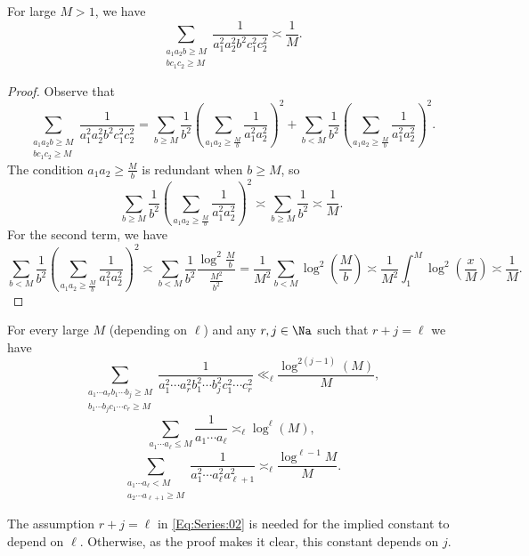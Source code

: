 \documentclass[12pt,a4paper]{amsart}
\begin{document}
\begin{lem01}
For large $M>1$, we have
\begin{equation}\label{Eq:01:02}
\sum_{\substack{a_1a_2 b\geq M \\ b c_1c_2\geq M}} \frac{1}{a_1^2a_2^2b^2c_1^2c_2^2}
\asymp
\frac{1}{M}. 
\end{equation}
\end{lem01}
\begin{proof}
Observe that
\[
\sum_{\substack{a_1a_2 b\geq M \\ b c_1c_2\geq M}} \frac{1}{a_1^2a_2^2b^2c_1^2c_2^2}
=
\sum_{b\geq M} 
\frac{1}{b^2}
\left( \sum_{a_1 a_2 \geq \frac{M}{b}} \frac{1}{a_1^2a_2^2}\right)^2
+
\sum_{b<M} 
\frac{1}{b^2}
\left( \sum_{a_1 a_2 \geq \frac{M}{b}} \frac{1}{a_1^2a_2^2}\right)^2.
\]
The condition $a_1a_2\geq \frac{M}{b}$ is redundant when $b\geq M$, so
\[
\sum_{b\geq M} 
\frac{1}{b^2}
\left( \sum_{a_1 a_2 \geq \frac{M}{b}} \frac{1}{a_1^2a_2^2}\right)^2
\asymp
\sum_{b\geq M} 
\frac{1}{b^2}
\asymp
\frac{1}{M}.
\]
For the second term, we have
\[
\sum_{b<M} 
\frac{1}{b^2}
\left( \sum_{a_1 a_2 \geq \frac{M}{b}} \frac{1}{a_1^2a_2^2}\right)^2
\asymp
\sum_{b<M} 
\frac{1}{b^2}
\frac{\log^2 \frac{M}{b} }{\frac{M^2}{b^2}}
=
\frac{1}{M^2}
\sum_{b<M} 
\log^2 \left(\frac{M}{b}\right)
\asymp
\frac{1}{M^2}
\int_1^M
\log^2\left( \frac{x}{M}\right)
\asymp
\frac{1}{M}.
\]
\end{proof}
\begin{lem01}\label{Lem:SerEstNu}
For every large $M$ (depending on $\ell$) and any $r,j \in\Na$ such that $r+j=\ell$ we have
\begin{equation}\label{Eq:Series:02}
\sum_{\substack{a_1 \cdots a_r b_1\cdots b_j\geq M \\ b_1\cdots b_j c_1 \cdots c_r\geq M}} \frac{1}{a_1^2\cdots a_r^2 b_1^2\cdots b_j^2 c_1^2 \cdots c_r^2}
\ll_{\ell} 
\frac{\log^{2(j-1)}(M)}{M},
\end{equation}
\begin{equation}\label{Eq:Series:03}
\sum_{a_1\cdots a_{\ell}\leq M} \frac{1}{a_1\cdots a_{\ell}} 
\asymp_{\ell}
\log^{\ell}(M), 
\end{equation}
\begin{equation}  \label{Eq:Series:04}
\sum_{\substack{a_1\cdots a_{\ell}<M \\ a_2\cdots a_{\ell+1}\geq M}} \frac{1}{a_1^2\cdots a_{\ell}^2a_{\ell+1}^2 }
\asymp_{\ell}
\frac{\log^{\ell-1}M}{M}. 
\end{equation}
\end{lem01}
\begin{rema01}
The assumption $r+j=\ell$ in \eqref{Eq:Series:02} is needed for the implied constant to depend on $\ell$. Otherwise, as the proof makes it clear, this constant depends on $j$.
\end{rema01}
\end{document}
